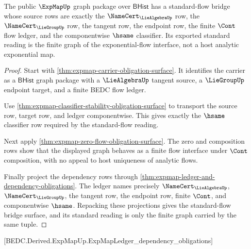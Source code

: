 \begin{theorem}
\label{thm:expmap-standard-flow-bridge-surface}
The public $\ExpMapUp$ graph package over $\mathsf{BHist}$ has a standard-flow
bridge whose source rows are exactly the $\NameCert_{\LieAlgebraUp}$ row, the
$\NameCert_{\LieGroupUp}$ row, the tangent row, the endpoint row, the finite
$\Cont$ flow ledger, and the componentwise $\hsame$ classifier. Its exported
standard reading is the finite graph of the exponential-flow interface, not a
host analytic exponential map.
\end{theorem}
\begin{proof}
Start with \autoref{thm:expmap-carrier-obligation-surface}. It identifies the
carrier as a $\mathsf{BHist}$ graph package with a $\LieAlgebraUp$ tangent
source, a $\LieGroupUp$ endpoint target, and a finite BEDC flow ledger.

Use \autoref{thm:expmap-classifier-stability-obligation-surface} to transport
the source row, target row, and ledger componentwise. This gives exactly the
$\hsame$ classifier row required by the standard-flow reading.

Next apply \autoref{thm:expmap-zero-flow-obligation-surface}. The zero and
composition rows show that the displayed graph behaves as a finite flow
interface under $\Cont$ composition, with no appeal to host uniqueness of
analytic flows.

Finally project the dependency rows through
\autoref{thm:expmap-ledger-and-dependency-obligations}. The ledger names
precisely $\NameCert_{\LieAlgebraUp}$, $\NameCert_{\LieGroupUp}$, the tangent
row, the endpoint row, finite $\Cont$, and componentwise $\hsame$. Repacking
these projections gives the standard-flow bridge surface, and its standard
reading is only the finite graph carried by the same tuple.
\end{proof}

[BEDC.Derived.ExpMapUp.ExpMapLedger\_dependency\_obligations]

